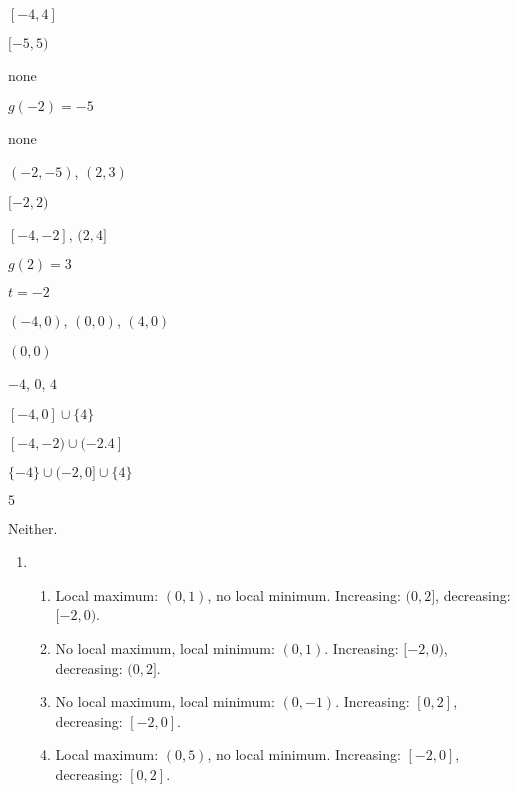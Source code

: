 \begin{shortexenum}[MMMMMMMMMM]
\item  $[-4,4]$ 
\item  $[-5,5)$
\item  none
\item  $g(-2) = -5$
\item  none
\item  $(-2,-5)$, $(2,3)$
\item  $[-2,2)$
\item  $[-4, -2]$, $(2,4]$
\item  $g(2) = 3$
\item  $t=-2$
\item $(-4,0)$, $(0,0)$, $(4,0)$
\item  $(0,0)$
\item  $-4$, $0$, $4$
\item  $[-4,0] \cup \{4\}$
\item $[-4,-2) \cup (-2.4]$
\item $\{-4\} \cup (-2,0] \cup \{4\}$
\item  $5$
\item Neither.
\end{shortexenum}

\begin{enumerate}
\setcounter{enumi}{\value{HW}}
\addtocounter{enumi}{4}
\item \begin{enumerate}
\item Local maximum: $(0,1)$, no local minimum.  Increasing: $(0,2]$, decreasing: $[-2,0)$.
\item No local maximum,  local minimum: $(0,1)$.  Increasing: $[-2,0)$, decreasing: $(0,2]$.
\item No local maximum,  local minimum: $(0,-1)$.  Increasing: $[0,2]$, decreasing: $[-2,0]$.
\item Local maximum: $(0,5)$, no local minimum.  Increasing: $[-2,0]$, decreasing: $[0,2]$.
\end{enumerate}

\setcounter{HW}{\value{enumi}}
\end{enumerate}
